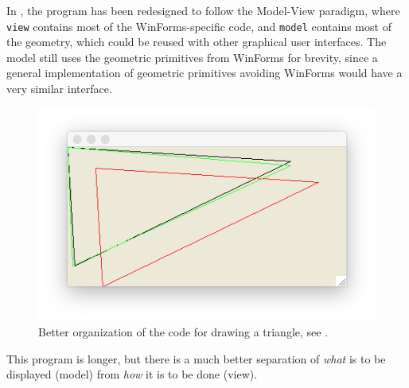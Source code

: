 \documentclass[fsharpnotes.tex]{subfiles}
\begin{document}
In , the program has been redesigned to follow the Model-View paradigm, where \lstinline{view} contains most of the WinForms-specific code, and \lstinline{model} contains most of the geometry, which could be reused with other graphical user interfaces. The model still uses the geometric primitives from WinForms for brevity, since a general implementation of geometric primitives avoiding WinForms would have a very similar interface.
%
%
\begin{figure}
  \centering
  \includegraphics[scale=0.3]{triangleOrganized}
  \caption{Better organization of the code for drawing a triangle, see .}
  \label{fig:triangleOrganized}
\end{figure}
This program is longer, but there is a much better separation of {\em what} is to be displayed (model) from {\em how} it is to be done (view).
\end{document}
